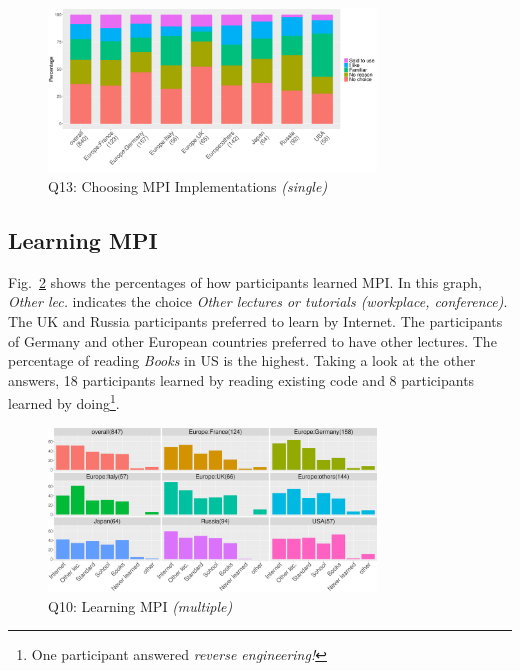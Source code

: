 \documentclass[preprint,5p,times]{elsarticle}
\def\myquote#1{{\it #1}}
\begin{document}
  \begin{figure}[htb]
    \begin{center}
      \includegraphics[width=8.7cm]{R-scripts/Q13.pdf}
      \caption{Q13: Choosing MPI Implementations {\it(single)}}
      \label{fig:choosing-implementation}
    \end{center}
  \end{figure}

\subsection{Learning MPI}\label{sec:learning-mpi}

Fig.~\ref{fig:learning-mpi} shows the percentages of how participants
learned MPI. In this graph, \myquote{Other lec.} indicates the choice
\myquote{Other lectures or tutorials (workplace, conference)}. The
UK and Russia participants preferred to learn by Internet. The
participants of Germany and other European countries preferred to have
other lectures. The percentage of reading \myquote{Books} in US is the
highest. Taking a look at the other answers, 18 participants learned
by reading existing code and 8 participants learned by
doing\footnote{One participant answered \myquote{reverse engineering!}}.

\begin{figure}[htb]
\begin{center}
\includegraphics[width=8.7cm]{R-scripts/Q10.pdf}
\caption{Q10: Learning MPI {\it(multiple)}}
\label{fig:learning-mpi}
\end{center}
\end{figure}
\end{document}
